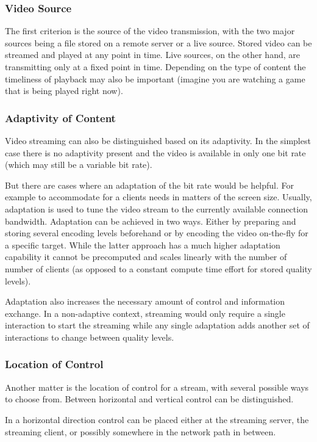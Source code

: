 \subsubsection{Video Source}
The first criterion is the source of the video transmission, with the two major sources being a file stored on a remote server or a live source. Stored video can be streamed and played at any point in time. Live sources, on the other hand, are transmitting only at a fixed point in time. Depending on the type of content the timeliness of playback may also be important (imagine you are watching a game that is being played right now).


\subsubsection{Adaptivity of Content}
Video streaming can also be distinguished based on its adaptivity. In the simplest case there is no adaptivity present and the video is available in only one bit rate (which may still be a variable bit rate). 

But there are cases where an adaptation of the bit rate would be helpful. For example to accommodate for a clients needs in matters of the screen size. Usually, adaptation is used to tune the video stream to the currently available connection bandwidth. Adaptation can be achieved in two ways. Either by preparing and storing several encoding levels beforehand or by encoding the video on-the-fly for a specific target. While the latter approach has a much higher adaptation capability it cannot be precomputed and scales linearly with the number of  number of clients (as opposed to a constant compute time effort for stored quality levels).

Adaptation also increases the necessary amount of control and information exchange. In a non-adaptive context, streaming would only require a single interaction to start the streaming while any single adaptation adds another set of interactions to change between quality levels.


\subsubsection{Location of Control}
Another matter is the location of control for a stream, with several possible ways to choose from. Between horizontal and vertical control can be distinguished.

In a horizontal direction control can be placed either at the streaming server, the streaming client, or possibly somewhere in the network path in between.


